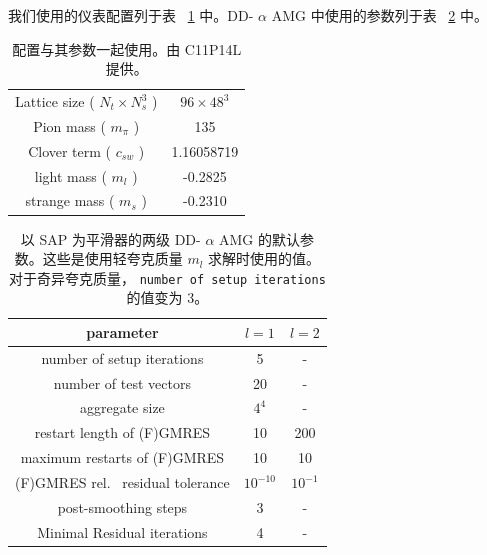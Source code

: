 \documentclass[5p,times,a4paper,fleqn]{cas-dc}
\begin{document}
我们使用的仪表配置列于表~    \ref{tab:config}    中。DD-    $\alpha$    AMG 中使用的参数列于表~    \ref{tab:parameter}    中。  

   \begin{table}[H]
        \centering
        \caption{配置与其参数一起使用。由 C11P14L    \cite{LIU2023137941}    提供。  }\label{tab:config}
        \begin{tabular}{cc}
        \hline
        Lattice size (        $N_t \times N_s^3$        )    &         $96\times 48^3$           \\ 
        Pion mass (        $m_{\pi}$        )                & 135               \\ 
        Clover term (        $c_{sw}$        )               & 1.16058719        \\ 
        light mass (        $m_{l}$        )                 & -0.2825           \\ 
        strange mass (        $m_{s}$        )               & -0.2310           \\  \hline
        \end{tabular}
\end{table}     

   \begin{table}[H]
    \centering
    \caption{以 SAP 为平滑器的两级 DD-    $\alpha$    AMG 的默认参数。这些是使用轻夸克质量    $m_{l}$    求解时使用的值。对于奇异夸克质量，   \texttt{number of setup iterations}    的值变为 3。  }
    \label{tab:parameter}
    \begin{tabular}{ccc}
    \hline
    parameter                          &         $l=1$              &         $l=2$               \\ \hline
    number of setup iterations         &   5        & -           \\ 
    number of test vectors             &   20       & -           \\ 
    aggregate size                     &         $4^4$              & -           \\ 
    restart length of (F)GMRES         & 10         & 200          \\ 
    maximum restarts of (F)GMRES       & 10         & 10          \\ 
    (F)GMRES rel. \  residual tolerance  &         $10^{-10}$         &         $10^{-1}$           \\ 
    post-smoothing steps               & 3          & -           \\ 
    Minimal Residual iterations        & 4          & -           \\ \hline
    \end{tabular}
\end{table}     

       
        


  
\end{document}
